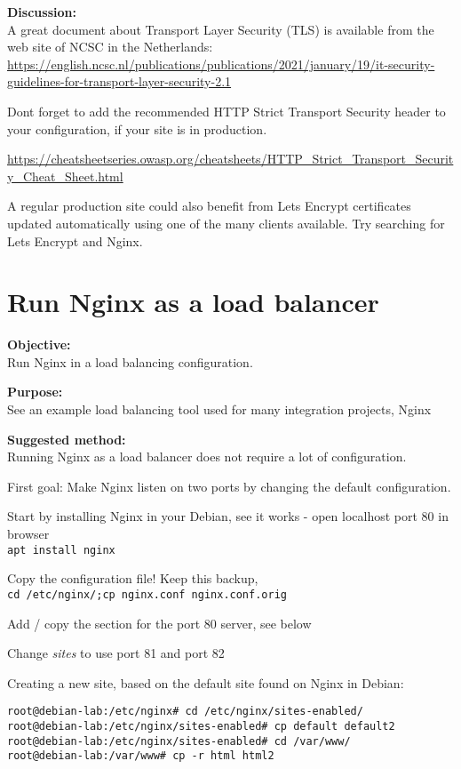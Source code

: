 \documentclass[a4paper,11pt,notitlepage]{report}
\begin{document}
{\bf Discussion:}\\
A great document about Transport Layer Security (TLS) is available from the web site of NCSC in the Netherlands:\\
{\scriptsize\url{https://english.ncsc.nl/publications/publications/2021/january/19/it-security-guidelines-for-transport-layer-security-2.1}}

Dont forget to add the recommended HTTP Strict Transport Security header to your configuration, if your site is in production.

{\footnotesize\url{https://cheatsheetseries.owasp.org/cheatsheets/HTTP_Strict_Transport_Security_Cheat_Sheet.html}}

A regular production site could also benefit from Lets Encrypt certificates updated automatically using one of the many clients available. Try searching for Lets Encrypt and Nginx.

\chapter{Run Nginx as a load balancer}
\label{ex:nginx-loadbalancer}


{\bf Objective:}\\
Run Nginx in a load balancing configuration.

{\bf Purpose:}\\
See an example load balancing tool used for many integration projects, Nginx

{\bf Suggested method:}\\
Running Nginx as a load balancer does not require a lot of configuration.

First goal: Make Nginx listen on two ports by changing the default configuration.

\begin{list2}
\item Start by installing Nginx in your Debian, see it works - open localhost port 80 in browser\\
\verb+apt install nginx+
\item Copy the configuration file! Keep this backup,\\
\verb+cd /etc/nginx/;cp nginx.conf nginx.conf.orig+
\item Add / copy the section for the port 80 server, see below
\item Change \emph{sites} to use port 81 and port 82
\end{list2}


Creating a new site, based on the default site found on Nginx in Debian:
\begin{verbatim}
root@debian-lab:/etc/nginx# cd /etc/nginx/sites-enabled/
root@debian-lab:/etc/nginx/sites-enabled# cp default default2
root@debian-lab:/etc/nginx/sites-enabled# cd /var/www/
root@debian-lab:/var/www# cp -r html html2
\end{verbatim}
\end{document}
